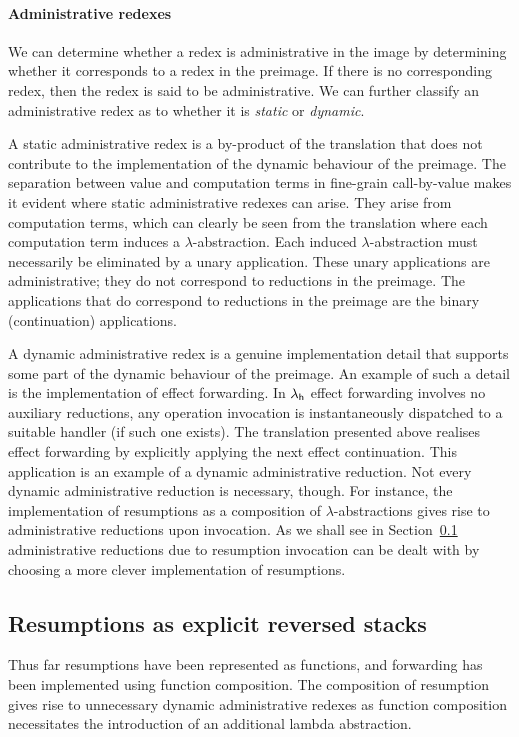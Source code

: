 \documentclass[12pt,phd,lfcs,twoside,openright,logo,leftchapter,normalheadings]{infthesis}
\theoremstyle{plain}
\theoremstyle{definition}
\begin{document}
\paragraph{Administrative redexes}

We can determine whether a redex is administrative in the image by
determining whether it corresponds to a redex in the preimage. If
there is no corresponding redex, then the redex is said to be
administrative. We can further classify an administrative redex as to
whether it is \emph{static} or \emph{dynamic}.

A static administrative redex is a by-product of the translation that
does not contribute to the implementation of the dynamic behaviour of
the preimage.
%
The separation between value and computation terms in fine-grain
call-by-value makes it evident where static administrative redexes can
arise. They arise from computation terms, which can clearly be seen
from the translation where each computation term induces a
$\lambda$-abstraction. Each induced $\lambda$-abstraction must
necessarily be eliminated by a unary application. These unary
applications are administrative; they do not correspond to reductions
in the preimage. The applications that do correspond to reductions in
the preimage are the binary (continuation) applications.

A dynamic administrative redex is a genuine implementation detail that
supports some part of the dynamic behaviour of the preimage. An
example of such a detail is the implementation of effect
forwarding. In $\lambda_{\mathsf{h}}$ effect forwarding involves no auxiliary
reductions, any operation invocation is instantaneously dispatched to
a suitable handler (if such one exists).
%
The translation presented above realises effect forwarding by
explicitly applying the next effect continuation. This application is
an example of a dynamic administrative reduction. Not every dynamic
administrative reduction is necessary, though. For instance, the
implementation of resumptions as a composition of
$\lambda$-abstractions gives rise to administrative reductions upon
invocation. As we shall see in
Section~\ref{sec:first-order-explicit-resump} administrative
reductions due to resumption invocation can be dealt with by choosing
a more clever implementation of resumptions.

\subsection{Resumptions as explicit reversed stacks}
\label{sec:first-order-explicit-resump}
%
%
Thus far resumptions have been represented as functions, and
forwarding has been implemented using function composition. The
composition of resumption gives rise to unnecessary dynamic
administrative redexes as function composition necessitates the
introduction of an additional lambda abstraction.
%
\end{document}
